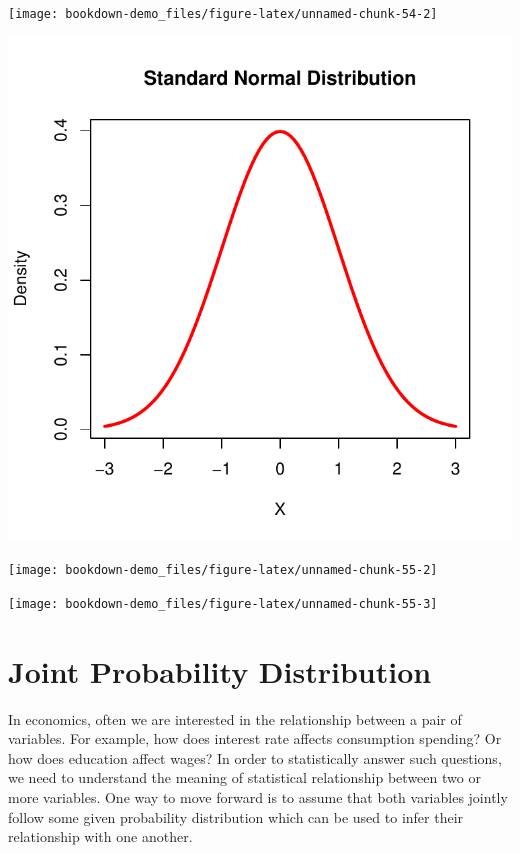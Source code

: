 \documentclass[]{book}
\theoremstyle{definition}
\theoremstyle{definition}
\theoremstyle{definition}
\theoremstyle{remark}
\begin{document}
\begin{center}\texttt{[image: bookdown-demo\_files/figure-latex/unnamed-chunk-54-2]} \end{center}

\begin{center}\includegraphics{bookdown-demo_files/figure-latex/unnamed-chunk-55-1} \end{center}

\begin{center}\texttt{[image: bookdown-demo\_files/figure-latex/unnamed-chunk-55-2]} \end{center}

\begin{center}\texttt{[image: bookdown-demo\_files/figure-latex/unnamed-chunk-55-3]} \end{center}

\hypertarget{joint-probability-distribution}{%
\section{Joint Probability Distribution}\label{joint-probability-distribution}}

In economics, often we are interested in the relationship between a pair of variables. For example, how does interest rate affects consumption spending? Or how does education affect wages? In order to statistically answer such questions, we need to understand the meaning of statistical relationship between two or more variables. One way to move forward is to assume that both variables jointly follow some given probability distribution which can be used to infer their relationship with one another.
\end{document}
